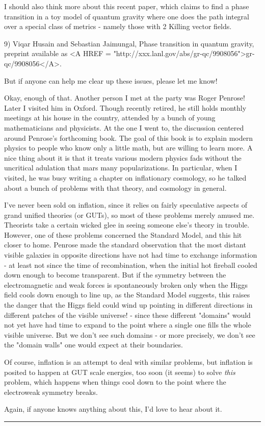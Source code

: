 I should also think more about this recent paper, which claims to
find a phase transition in a toy model of quantum gravity where
one does the path integral over a special class of metrics - namely 
those with 2 Killing vector fields.

9) Viqar Husain and Sebastian Jaimungal, Phase transition in 
quantum gravity, preprint available as <A HREF = "http://xxx.lanl.gov/abs/gr-qc/9908056">gr-qc/9908056</A>.

But if anyone can help me clear up these issues, please let me know!

Okay, enough of that.  Another person I met at the party was Roger
Penrose!  Later I visited him in Oxford.  Though recently retired,
he still holds monthly meetings at his house in the country, attended
by a bunch of young mathematicians and physicists.  At the one I went
to, the discussion centered around Penrose's forthcoming book.  The goal 
of this book is to explain modern physics to people who know only a 
little math, but are willing to learn more.  A nice thing about it is
that it treats various modern physics fads without the uncritical 
adulation that mars many popularizations.  In particular, when I 
visited, he was busy writing a chapter on inflationary cosmology, 
so he talked about a bunch of problems with that theory, and cosmology
in general.  

I've never been sold on inflation, since it relies on fairly speculative
aspects of grand unified theories (or GUTs), so most of these problems merely 
amused me.  Theorists take a certain wicked glee in seeing someone else's 
theory in trouble.  However, one of these problems concerned the Standard 
Model, and this hit closer to home.  Penrose made the standard observation 
that the most distant visible galaxies in opposite directions have not had 
time to exchange information - at least not since the time of recombination, 
when the initial hot fireball cooled down enough to become transparent.  
But if the symmetry between the electromagnetic and weak forces is 
spontaneously broken only when the Higgs field cools down enough to line 
up, as the Standard Model suggests, this raises the danger that the Higgs 
field could wind up pointing in different directions in different patches 
of the visible universe! - since these different "domains" would not yet 
have had time to expand to the point where a single one fills the whole 
visible universe.  But we don't see such domains - or more precisely, we 
don't see the "domain walls" one would expect at their boundaries.  

Of course, inflation is an attempt to deal with similar problems, but 
inflation is posited to happen at GUT scale energies, too soon (it seems)
to solve \emph{this} problem, which happens when things cool down to the 
point where the electroweak symmetry breaks.  

Again, if anyone knows anything about this, I'd love to hear about it.


 \par\noindent\rule{\textwidth}{0.4pt}


